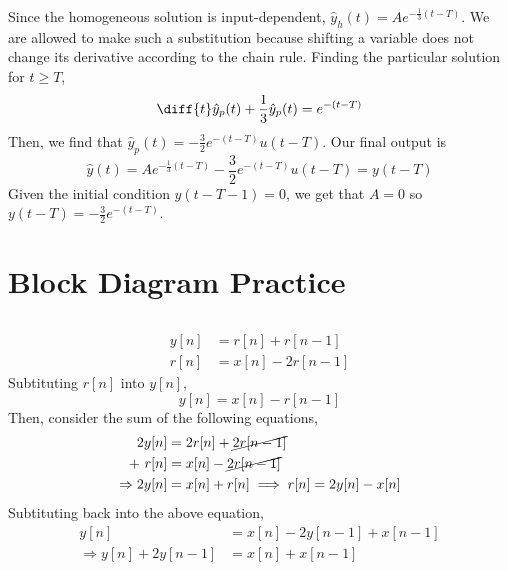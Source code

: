 \documentclass{article}
\begin{document}
Since the homogeneous solution is input-dependent, \(\hat{y}_h(t) = A e^{-\frac{1}{3} (t - T)}\).
We are allowed to make such a substitution because shifting a variable does not change its derivative according to the chain rule.
Finding the particular solution for \(t \geqslant T\),
\begin{equation}
    \diff{t} \hat{y}_p(t) + \frac{1}{3} \hat{y}_p(t) = e^{-(t - T)}
\end{equation}
Then, we find that \(\hat{y}_p(t) = -\frac{3}{2} e^{-(t - T)} u(t - T)\).
Our final output is
\begin{equation}
    \hat{y}(t) = A e^{-\frac{1}{3}(t - T)} - \frac{3}{2} e^{-(t - T)} u(t - T) = y(t - T)
\end{equation}
Given the initial condition \(y(t - T - 1) = 0\), we get that \(A = 0\) so \(y(t - T) = -\frac{3}{2} e^{-(t - T)}\).

\section{Block Diagram Practice}

\subsection{}

\begin{align}
    y[n] &= r[n] + r[n - 1] \\
    r[n] &= x[n] - 2r[n - 1]
\end{align}
Subtituting \(r[n]\) into \(y[n]\),
\begin{equation}
    y[n] = x[n] - r[n - 1]
\end{equation}
Then, consider the sum of the following equations,
\begin{align}
    2y[n] &= 2r[n] + \cancel{2r[n - 1]} \\
    + \ r[n] &= x[n] - \cancel{2r[n - 1]} \\
    \Rightarrow 2y[n] &= x[n] + r[n] \implies r[n] = 2y[n] - x[n]
\end{align}
Subtituting back into the above equation,
\begin{align}
    y[n] &= x[n] - 2y[n - 1] + x[n - 1] \\
    \Rightarrow y[n] + 2y[n - 1] &= x[n] + x[n - 1]
\end{align}

\subsection{}
\end{document}
